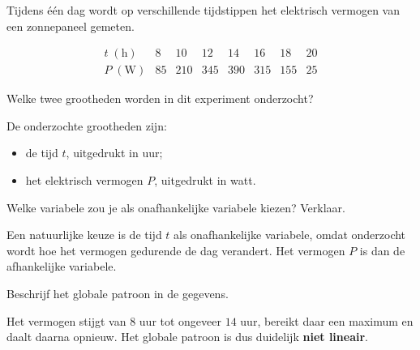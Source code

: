 \documentclass{ximera}
\begin{document}
\begin{oefening}{\oefU \ESS}

Tijdens één dag wordt op verschillende tijdstippen het elektrisch
vermogen van een zonnepaneel gemeten.

\[
\begin{array}{c|ccccccc}
t\;(\mathrm h)
&8&10&12&14&16&18&20\\ \hline
P\;(\mathrm W)
&85&210&345&390&315&155&25
\end{array}
\]

\begin{question}
Welke twee grootheden worden in dit experiment onderzocht?

\begin{freeResponse}
\end{freeResponse}


\begin{oplossing}
De onderzochte grootheden zijn:
\begin{itemize}
  \item de tijd $t$, uitgedrukt in uur;
  \item het elektrisch vermogen $P$, uitgedrukt in watt.
\end{itemize}
\end{oplossing}

\end{question}

\begin{question}
Welke variabele zou je als onafhankelijke variabele kiezen? Verklaar.

\begin{freeResponse}
\end{freeResponse}


\begin{oplossing}
Een natuurlijke keuze is de tijd $t$ als onafhankelijke variabele,
omdat onderzocht wordt hoe het vermogen gedurende de dag verandert.
Het vermogen $P$ is dan de afhankelijke variabele.
\end{oplossing}

\end{question}

\begin{question}
Beschrijf het globale patroon in de gegevens.

\begin{freeResponse}
\end{freeResponse}


\begin{oplossing}
Het vermogen stijgt van $8$ uur tot ongeveer $14$ uur, bereikt daar
een maximum en daalt daarna opnieuw. Het globale patroon is dus
duidelijk \textbf{niet lineair}.
\end{oplossing}


\end{question}
\end{oefening}
\end{document}
